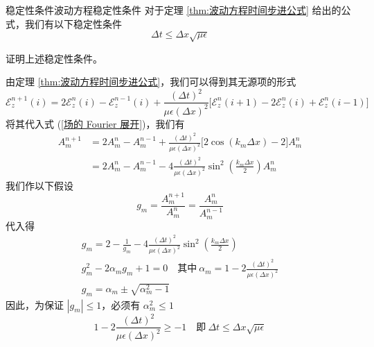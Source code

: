 \begin{theorem}{稳定性条件}{波动方程稳定性条件}
    对于定理 \ref{thm:波动方程时间步进公式} 给出的公式，我们有以下稳定性条件
    \begin{equation}
        \Delta t \leq \Delta x \sqrt{\mu \epsilon}
    \end{equation}
\end{theorem}

\begin{exercise}
    证明上述稳定性条件。
\end{exercise}

\begin{solution}
    由定理 \ref{thm:波动方程时间步进公式}，我们可以得到其无源项的形式
    \begin{equation*}
        \mathscr{E}_z^{n+1}(i)=2\mathscr{E}_z^n(i)-\mathscr{E}_z^{n-1}(i)
        +\frac{(\Delta t)^2}{\mu \epsilon (\Delta x)^2}
        \Big[\mathscr{E}_z^n(i+1)-2\mathscr{E}_z^n(i)+\mathscr{E}_z^n(i-1)\Big]
    \end{equation*}
    将其代入式 (\ref{场的 Fourier 展开})，我们有
    \begin{align*}
        A_m^{n+1}&=2A_m^n-A_m^{n-1}
        +\frac{(\Delta t)^2}{\mu \epsilon (\Delta x)^2}
        \Big[2\cos (k_m \Delta x)-2]A_m^n\\
        &=2A_m^n-A_m^{n-1}
        -4\frac{(\Delta t)^2}{\mu \epsilon (\Delta x)^2}
        \sin^2\left(\frac{k_m \Delta x}{2}\right)A_m^n
    \end{align*}
    我们作以下假设
    \begin{equation*}
        g_m=\frac{A^{n+1}_m}{A^{n}_m}=\frac{A^{n}_m}{A^{n-1}_m}
    \end{equation*}
    代入得
    \begin{gather*}
        g_m=2-\frac{1}{g_m}-4\frac{(\Delta t)^2}{\mu \epsilon (\Delta x)^2}
        \sin^2\left(\frac{k_m \Delta x}{2}\right)\\
        g_m^2-2\alpha_m g_m+1=0 \quad
        \text{其中} \ \alpha_m=1-2\frac{(\Delta t)^2}{\mu \epsilon (\Delta x)^2}\\
        g_m = \alpha_m \pm \sqrt{\alpha_m^2-1}
    \end{gather*}
    因此，为保证 $|g_m|\leq 1$，必须有 $\alpha_m^2 \leq 1$
    \begin{equation*}
        1-2\frac{(\Delta t)^2}{\mu \epsilon (\Delta x)^2} \geq -1
        \quad \text{即} \ 
        \Delta t \leq \Delta x \sqrt{\mu \epsilon}
    \end{equation*}
\end{solution}

